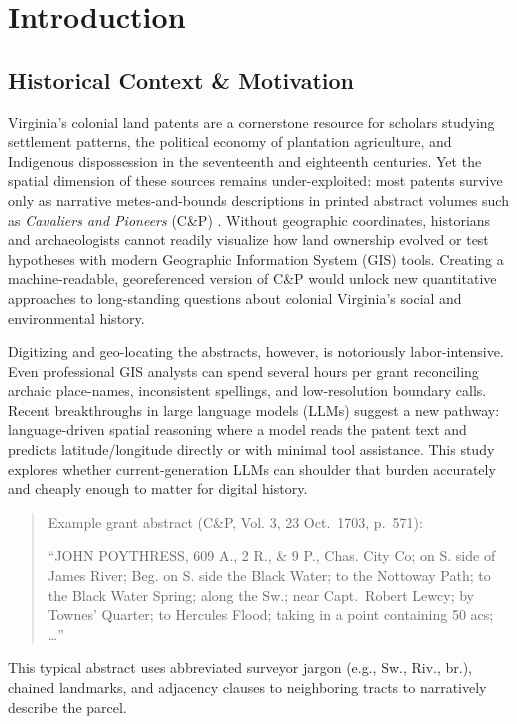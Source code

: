 \section{Introduction}\label{introduction}

\subsection{Historical Context \&
Motivation}\label{historical-context-motivation}

Virginia's colonial land patents are a cornerstone resource for scholars
studying settlement patterns, the political economy of plantation
agriculture, and Indigenous dispossession in the seventeenth and
eighteenth centuries. Yet the spatial dimension of these sources remains
under-exploited: most patents survive only as narrative metes-and-bounds
descriptions in printed abstract volumes such as \emph{Cavaliers and
Pioneers} (C\&P) \citep{Nugent1979_cavaliers3}. Without geographic
coordinates, historians and archaeologists cannot readily visualize how
land ownership evolved or test hypotheses with modern Geographic
Information System (GIS) tools. Creating a machine-readable,
georeferenced version of C\&P would unlock new quantitative approaches
to long-standing questions about colonial Virginia's social and
environmental history.

Digitizing and geo-locating the abstracts, however, is notoriously
labor-intensive. Even professional GIS analysts can spend several hours
per grant reconciling archaic place-names, inconsistent spellings, and
low-resolution boundary calls. Recent breakthroughs in large language
models (LLMs) suggest a new pathway: language-driven spatial reasoning
where a model reads the patent text and predicts latitude/longitude
directly or with minimal tool assistance. This study explores whether
current-generation LLMs can shoulder that burden accurately and cheaply
enough to matter for digital history.

\begin{quote}
Example grant abstract (C\&P, Vol. 3, 23 Oct.~1703, p.~571):

``JOHN POYTHRESS, 609 A., 2 R., \& 9 P., Chas. City Co; on S. side of
James River; Beg. on S. side the Black Water; to the Nottoway Path; to
the Black Water Spring; along the Sw.; near Capt.~Robert Lewcy; by
Townes' Quarter; to Hercules Flood; taking in a point containing 50 acs;
\ldots{}''
\end{quote}

This typical abstract uses abbreviated surveyor jargon (e.g., Sw., Riv.,
br.), chained landmarks, and adjacency clauses to neighboring tracts to
narratively describe the parcel.

